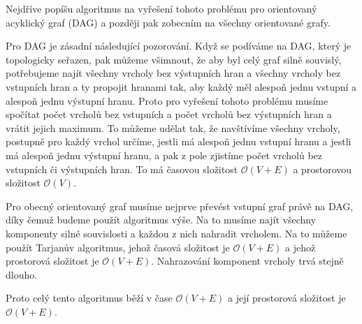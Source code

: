\documentclass{fkssolpub}
\author{Ondřej Sedláček}
\begin{document}
Nejdříve popíšu algoritmus na vyřešení tohoto problému pro orientovaný acyklický
graf (DAG) a později pak zobecním na všechny orientované grafy.

Pro DAG je zásadní následující pozorování. Když se podíváme na DAG, který je
topologicky seřazen, pak můžeme všimnout, že aby byl celý graf silně souvislý, 
potřebujeme najít všechny vrcholy bez výstupních hran a všechny vrcholy 
bez vstupních hran a ty propojit hranami tak, aby každý měl alespoň
jednu vstupní a alespoň jednu výstupní hranu. Proto pro vyřešení tohoto problému 
musíme spočítat počet vrcholů bez vstupních a počet vrcholů bez výstupních hran 
a vrátit jejich maximum. To můžeme udělat tak, že navštívíme všechny
vrcholy, postupně pro každý vrchol určíme, jestli má alespoň jednu vstupní hranu
a jestli má alespoň jednu výstupní hranu, a pak z pole zjistíme počet vrcholů bez 
vstupních či výstupních hran. To má časovou složitost $\mathcal{O}(V + E)$ a
prostorovou složitost $\mathcal{O}(V)$.

Pro obecný orientovaný graf musíme nejprve převést vstupní graf právě na
DAG, díky čemuž budeme použít algoritmus výše. Na to musíme najít
všechny komponenty silné souvislosti a každou z nich nahradit vrcholem.
Na to můžeme použít Tarjanův algoritmus, jehož časová složitost je
$\mathcal{O}(V + E)$ a jehož prostorová složitost je $\mathcal{O}(V + E)$. 
Nahrazování komponent vrcholy trvá stejně dlouho.

Proto celý tento algoritmus běží v čase $\mathcal{O}(V + E)$ a její prostorová složitost
je $\mathcal{O}(V + E)$.
  
\end{document}

